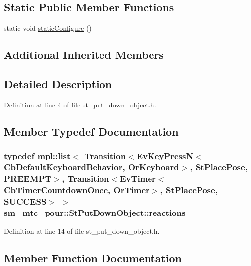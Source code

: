 \subsection*{Static Public Member Functions}
\begin{DoxyCompactItemize}
\item 
static void \hyperlink{structsm__mtc__pour_1_1StPutDownObject_a279d60999eaa1d4c69da7ea26b82123b}{static\+Configure} ()
\end{DoxyCompactItemize}
\subsection*{Additional Inherited Members}


\subsection{Detailed Description}


Definition at line 4 of file st\+\_\+put\+\_\+down\+\_\+object.\+h.



\subsection{Member Typedef Documentation}
\subsubsection[{\texorpdfstring{reactions}{reactions}}]{\setlength{\rightskip}{0pt plus 5cm}typedef mpl\+::list$<$ Transition$<$Ev\+Key\+PressN$<$Cb\+Default\+Keyboard\+Behavior, {\bf Or\+Keyboard}$>$, {\bf St\+Place\+Pose}, {\bf P\+R\+E\+E\+M\+PT}$>$, Transition$<$Ev\+Timer$<$Cb\+Timer\+Countdown\+Once, {\bf Or\+Timer}$>$, {\bf St\+Place\+Pose}, {\bf S\+U\+C\+C\+E\+SS}$>$ $>$ {\bf sm\+\_\+mtc\+\_\+pour\+::\+St\+Put\+Down\+Object\+::reactions}}\hypertarget{structsm__mtc__pour_1_1StPutDownObject_aa6260e2e52eef27a38a549540092cc04}{}\label{structsm__mtc__pour_1_1StPutDownObject_aa6260e2e52eef27a38a549540092cc04}


Definition at line 14 of file st\+\_\+put\+\_\+down\+\_\+object.\+h.



\subsection{Member Function Documentation}
